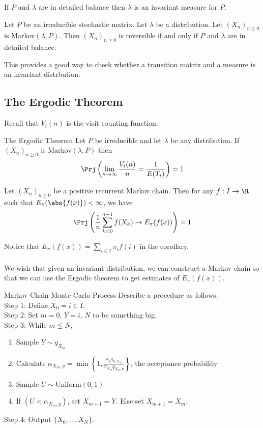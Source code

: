 \documentclass[a4paper]{article}
\begin{document}
\begin{lmm}{}{} If $P$ and $\lambda$ are in detailed balance then $\lambda$ is an invariant measure for $P$. 
\end{lmm}

\begin{thm}{}{} Let $P$ be an irreducible stochastic matrix. Let $\lambda$ be a distribution. Let $(X_n)_{n\geq 0}$ is Markov$(\lambda,P)$. Then $(X_n)_{n\geq 0}$ is reversible if and only if $P$ and $\lambda$ are in detailed balance. 
\end{thm}

This provides a good way to check whether a transition matrix and a measure is an invariant distrbution. 

\subsection{The Ergodic Theorem}
Recall that $V_i(n)$ is the visit counting function. 

\begin{thm}{The Ergodic Theorem}{} Let $P$ be irreducible and let $\lambda$ be any distribution. If $(X_n)_{n\geq 0}$ is Markov$(\lambda,P)$ then $$\Prj\left(\lim_{n\to\infty}\frac{V_i(n)}{n}=\frac{1}{E(T_i)}\right)=1$$
\end{thm}

\begin{crl}{}{} Let $(X_n)_{n\geq 0}$ be a positive recurrent Markov chain. Then for any $f:I\to\R$ such that $E_\pi(\abs{f(x)})<\infty$, we have $$\Prj\left(\frac{1}{n}\sum_{k=0}^{n-1}f(X_k)\to E_\pi(f(x))\right)=1$$
\end{crl}

Notice that $E_\pi(f(x))=\sum_{i\in I}\pi_if(i)$ in the corollary. \\~\\

We wish that given an invariant distribution, we can construct a Markov chain so that we can use the Ergodic theorem to get estimates of $E_\pi(f(x))$. 

\begin{thm}{Markov Chain Monte Carlo Process}{} Describe a procedure as follows. \\
Step 1: Define $X_0=i\in I$. \\
Step 2: Set $m=0$, $Y=i$, $N$ to be something big. \\
Step 3: While $m\leq N$, 
\begin{enumerate} 
\item Sample $Y\sim q_{X_m}$
\item Calculate $\alpha_{X_m,y}=\min\left\{1,\frac{\pi_yq_{y,X_m}}{\pi_{X_m}q_{X_m,y}}\right\}$, the acceptance probability
\item Sample $U\sim\text{Uniform}(0,1)$
\item If $(U<\alpha_{X_m,y})$, set $X_{m+1}=Y$. Else set $X_{m+1}=X_m$. 
\end{enumerate}
Step 4: Output $\{X_0,\dots,X_N\}$. 
\end{thm}
\end{document}
